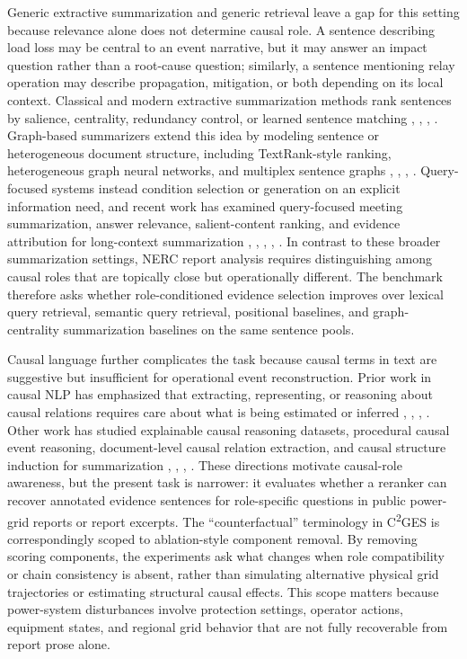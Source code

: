 \documentclass{ieeeaccess}
\begin{document}
Generic extractive summarization and generic retrieval leave a gap for this setting because relevance alone does not determine causal role. A sentence describing load loss may be central to an event narrative, but it may answer an impact question rather than a root-cause question; similarly, a sentence mentioning relay operation may describe propagation, mitigation, or both depending on its local context. Classical and modern extractive summarization methods rank sentences by salience, centrality, redundancy control, or learned sentence matching \cite{zhong2020extractive}, \cite{bi2021aredsum}, \cite{joshi2022ranksuman}, \cite{xu2020discourseaware}. Graph-based summarizers extend this idea by modeling sentence or heterogeneous document structure, including TextRank-style ranking, heterogeneous graph neural networks, and multiplex sentence graphs \cite{khor2021text}, \cite{wang2020heterogeneous}, \cite{jing2021multiplex}, \cite{cui2020enhancing}. Query-focused systems instead condition selection or generation on an explicit information need, and recent work has examined query-focused meeting summarization, answer relevance, salient-content ranking, and evidence attribution for long-context summarization \cite{vig2022exploring}, \cite{su2021improve}, \cite{liu2023rank}, \cite{sotudeh2024rank}, \cite{wright2025unstructured}. In contrast to these broader summarization settings, NERC report analysis requires distinguishing among causal roles that are topically close but operationally different. The benchmark therefore asks whether role-conditioned evidence selection improves over lexical query retrieval, semantic query retrieval, positional baselines, and graph-centrality summarization baselines on the same sentence pools.

Causal language further complicates the task because causal terms in text are suggestive but insufficient for operational event reconstruction. Prior work in causal NLP has emphasized that extracting, representing, or reasoning about causal relations requires care about what is being estimated or inferred \cite{feder2022causal}, \cite{kcman2023causal}, \cite{gao2023chatgpt}, \cite{wang2024causalbench}. Other work has studied explainable causal reasoning datasets, procedural causal event reasoning, document-level causal relation extraction, and causal structure induction for summarization \cite{du2022ecare}, \cite{zhang2023causal}, \cite{wang2024documentlevel}, \cite{chen2023inducing}. These directions motivate causal-role awareness, but the present task is narrower: it evaluates whether a reranker can recover annotated evidence sentences for role-specific questions in public power-grid reports or report excerpts. The ``counterfactual'' terminology in C\textsuperscript{2}GES is correspondingly scoped to ablation-style component removal. By removing scoring components, the experiments ask what changes when role compatibility or chain consistency is absent, rather than simulating alternative physical grid trajectories or estimating structural causal effects. This scope matters because power-system disturbances involve protection settings, operator actions, equipment states, and regional grid behavior that are not fully recoverable from report prose alone.
\end{document}
